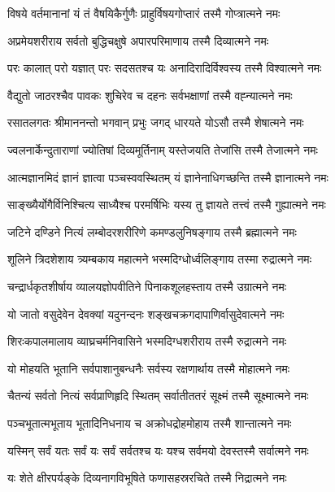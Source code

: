 \twolineshloka
{विषये वर्तमानानां यं तं वैषयिकैर्गुणैः}
{प्राहुर्विषयगोप्तारं तस्मै गोप्त्रात्मने नमः} %


\twolineshloka
{अप्रमेयशरीराय सर्वतो बुद्धिचक्षुषे}
{अपारपरिमाणाय तस्मै दिव्यात्मने नमः} %


\twolineshloka
{परः कालात् परो यज्ञात् परः सदसतश्च यः}
{अनादिरादिर्विश्वस्य तस्मै विश्वात्मने नमः} %


\twolineshloka
{वैद्युतो जाठरश्चैव पावकः शुचिरेव च}
{दहनः सर्वभक्षाणां तस्मै वह्न्यात्मने नमः} %


\twolineshloka
{रसातलगतः श्रीमाननन्तो भगवान् प्रभुः}
{जगद् धारयते योऽसौ तस्मै शेषात्मने नमः} %


\twolineshloka
{ज्वलनार्केन्दुताराणां ज्योतिषां दिव्यमूर्तिनाम्}
{यस्तेजयति तेजांसि तस्मै तेजात्मने नमः} %


\twolineshloka
{आत्मज्ञानमिदं ज्ञानं ज्ञात्वा पञ्चस्ववस्थितम्}
{यं ज्ञानेनाधिगच्छन्ति तस्मै ज्ञानात्मने नमः} %


\twolineshloka
{साङ्ख्यैर्योगैर्विनिश्चित्य साध्यैश्च परमर्षिभिः}
{यस्य तु ज्ञायते तत्त्वं तस्मै गुह्यात्मने नमः} %


\twolineshloka
{जटिने दण्डिने नित्यं लम्बोदरशरीरिणे}
{कमण्डलुनिषङ्गाय तस्मै ब्रह्मात्मने नमः} %


\twolineshloka
{शूलिने त्रिदशेशाय त्र्यम्बकाय महात्मने}
{भस्मदिग्धोर्ध्वलिङ्गाय तस्मा रुद्रात्मने नमः} %


\twolineshloka
{चन्द्रार्धकृतशीर्षाय व्यालयज्ञोपवीतिने}
{पिनाकशूलहस्ताय तस्मै उग्रात्मने नमः} %


\twolineshloka
{यो जातो वसुदेवेन देवक्यां यदुनन्दनः}
{शङ्खचक्रगदापाणिर्वासुदेवात्मने नमः} %


\twolineshloka
{शिरःकपालमालाय व्याघ्रचर्मनिवासिने}
{भस्मदिग्धशरीराय तस्मै रुद्रात्मने नमः} %


\twolineshloka
{यो मोहयति भूतानि सर्वपाशानुबन्धनैः}
{सर्वस्य रक्षणार्थाय तस्मै मोहात्मने नमः} %


\twolineshloka
{चैतन्यं सर्वतो नित्यं सर्वप्राणिहृदि स्थितम्}
{सर्वातीततरं सूक्ष्मं तस्मै सूक्ष्मात्मने नमः} %


\twolineshloka
{पञ्चभूतात्मभूताय भूतादिनिधनाय च}
{अक्रोधद्रोहमोहाय तस्मै शान्तात्मने नमः} %


\twolineshloka
{यस्मिन् सर्वं यतः सर्वं यः सर्वं सर्वतश्च यः}
{यश्च सर्वमयो देवस्तस्मै सर्वात्मने नमः} %


\twolineshloka
{यः शेते क्षीरपर्यङ्के दिव्यनागविभूषिते}
{फणासहस्ररचिते तस्मै निद्रात्मने नमः} %


